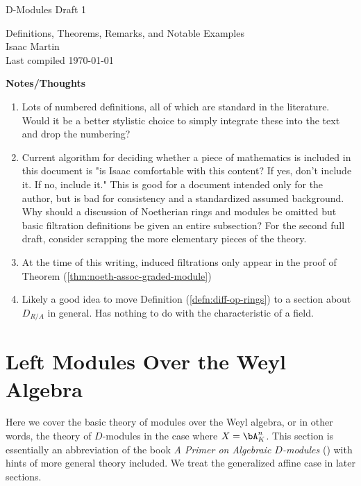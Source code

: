 


\begin{center}
	\Large
	\begin{LARGE}
		D-Modules Draft 1 \\
	\end{LARGE}
	Definitions, Theorems, Remarks, and Notable Examples \\
	Isaac Martin \\
    Last compiled \today
\end{center}
\normalsize
\vspace{-2mm}
\hru

\tableofcontents
\newpage
\noindent \textbf{Notes/Thoughts}
\begin{enumerate}
	\item Lots of numbered definitions, all of which are standard in the literature. Would it be a better stylistic choice to simply integrate these into the text and drop the numbering?
	\item Current algorithm for deciding whether a piece of mathematics is included in this document is "is Isaac comfortable with this content? If yes, don't include it. If no, include it." This is good for a document intended only for the author, but is bad for consistency and a standardized assumed background. Why should a discussion of Noetherian rings and modules be omitted but basic filtration definitions be given an entire subsection? For the second full draft, consider scrapping the more elementary pieces of the theory.
	\item At the time of this writing, induced filtrations only appear in the proof of Theorem (\ref{thm:noeth-assoc-graded-module})
	\item Likely a good idea to move Definition (\ref{defn:diff-op-rings}) to a section about $D_{R/A}$ in general. Has nothing to do with the characteristic of a field.
\end{enumerate}
\newpage

\section{Left Modules Over the Weyl Algebra}
Here we cover the basic theory of modules over the Weyl algebra, or in other words, the theory of $D$-modules in the case where $X = \bA^n_K$. This section is essentially an abbreviation of the book \emph{A Primer on Algebraic $D$-modules} (\cite{d-mod-primer}) with hints of more general theory included. We treat the generalized affine case in later sections.

